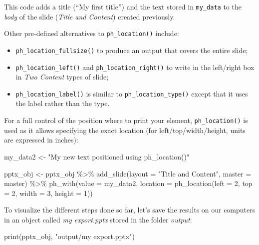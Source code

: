 \documentclass[
]{krantz}
\makeatletter
\newenvironment{Shaded}{\begin{snugshade}}{\end{snugshade}}
\newcommand{\AttributeTok}[1]{\textcolor[rgb]{0.61,0.61,0.61}{#1}}
\newcommand{\DecValTok}[1]{\textcolor[rgb]{0.06,0.06,0.06}{#1}}
\newcommand{\FunctionTok}[1]{\textcolor[rgb]{0,0,0}{#1}}
\newcommand{\NormalTok}[1]{#1}
\newcommand{\OtherTok}[1]{\textcolor[rgb]{0.37,0.37,0.37}{#1}}
\newcommand{\SpecialCharTok}[1]{\textcolor[rgb]{0,0,0}{#1}}
\newcommand{\StringTok}[1]{\textcolor[rgb]{0.5,0.5,0.5}{#1}}
\providecommand{\tightlist}{%
  \setlength{\itemsep}{0pt}\setlength{\parskip}{0pt}}
\newenvironment{kframe}{%
\medskip{}
\setlength{\fboxsep}{.8em}
 \def\at@end@of@kframe{}%
 \ifinner\ifhmode%
  \def\at@end@of@kframe{\end{minipage}}%
  \begin{minipage}{\columnwidth}%
 \fi\fi%
 \def\FrameCommand##1{\hskip\@totalleftmargin \hskip-\fboxsep
 \colorbox{shadecolor}{##1}\hskip-\fboxsep
     \hskip-\linewidth \hskip-\@totalleftmargin \hskip\columnwidth}%
 \MakeFramed {\advance\hsize-\width
   \@totalleftmargin\z@ \linewidth\hsize
   \@setminipage}}%
 {\par\unskip\endMakeFramed%
 \at@end@of@kframe}
\renewenvironment{Shaded}{\begin{kframe}}{\end{kframe}}
\makeatother
\begin{document}
This code adds a title (``My first title'') and the text stored in \texttt{my\_data} to the \emph{body} of the slide (\emph{Title and Content}) created previously.

Other pre-defined alternatives to \texttt{ph\_location()} include:

\begin{itemize}
\tightlist
\item
  \texttt{ph\_location\_fullsize()} to produce an output that covers the entire slide;
\item
  \texttt{ph\_location\_left()} and \texttt{ph\_location\_right()} to write in the left/right box in \emph{Two Content} types of slide;
\item
  \texttt{ph\_location\_label()} is similar to \texttt{ph\_location\_type()} except that it uses the label rather than the type.
\end{itemize}

For a full control of the position where to print your element, \texttt{ph\_location()} is used as it allows specifying the exact location (for left/top/width/height, units are expressed in inches):

\begin{Shaded}
\begin{Highlighting}[]
\NormalTok{my\_data2 }\OtherTok{\textless{}{-}} \StringTok{"My new text positioned using ph\_location()"}

\NormalTok{pptx\_obj }\OtherTok{\textless{}{-}}\NormalTok{ pptx\_obj }\SpecialCharTok{\%\textgreater{}\%}
  \FunctionTok{add\_slide}\NormalTok{(}\AttributeTok{layout =} \StringTok{"Title and Content"}\NormalTok{, }\AttributeTok{master =}\NormalTok{ master) }\SpecialCharTok{\%\textgreater{}\%} 
  \FunctionTok{ph\_with}\NormalTok{(}\AttributeTok{value =}\NormalTok{ my\_data2, }\AttributeTok{location =} \FunctionTok{ph\_location}\NormalTok{(}\AttributeTok{left =} \DecValTok{2}\NormalTok{, }\AttributeTok{top =} \DecValTok{2}\NormalTok{, }\AttributeTok{width =} \DecValTok{3}\NormalTok{, }\AttributeTok{height =} \DecValTok{1}\NormalTok{))}
\end{Highlighting}
\end{Shaded}

To visualize the different steps done so far, let's save the results on our computers in an object called \emph{my export.pptx} stored in the folder \emph{output}:

\begin{Shaded}
\begin{Highlighting}[]
\FunctionTok{print}\NormalTok{(pptx\_obj, }\StringTok{"output/my export.pptx"}\NormalTok{)}
\end{Highlighting}
\end{Shaded}
\end{document}
